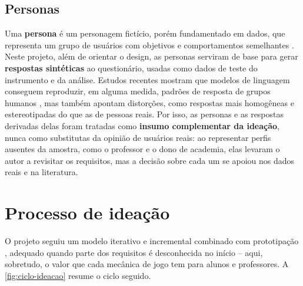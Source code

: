 \subsection{Personas}

Uma \textbf{persona} é um personagem fictício, porém fundamentado em
dados, que representa um grupo de usuários com objetivos e
comportamentos semelhantes \cite{cooper1999,pruitt2006}. Neste projeto,
além de orientar o design, as personas serviram de base para gerar
\textbf{respostas sintéticas} ao questionário, usadas como dados de teste
do instrumento e da análise. Estudos recentes mostram que modelos de
linguagem conseguem reproduzir, em alguma medida, padrões de resposta de
grupos humanos \cite{argyle2023,aher2023}, mas também apontam distorções,
como respostas mais homogêneas e estereotipadas do que as de pessoas
reais. Por isso, as personas e as respostas derivadas delas foram
tratadas como \textbf{insumo complementar da ideação}, nunca como
substitutas da opinião de usuários reais: ao representar perfis ausentes
da amostra, como o professor e o dono de academia, elas levaram o autor
a revisitar os requisitos, mas a decisão sobre cada um se apoiou nos
dados reais e na literatura.

\section{Processo de ideação}
\label{sec:processo-ideacao}

O projeto seguiu um modelo iterativo e incremental combinado com
prototipação \cite{sommerville2019,pressman2021}, adequado quando parte
dos requisitos é desconhecida no início -- aqui, sobretudo, o valor que
cada mecânica de jogo tem para alunos e professores. A
\autoref{fig:ciclo-ideacao} resume o ciclo seguido.

